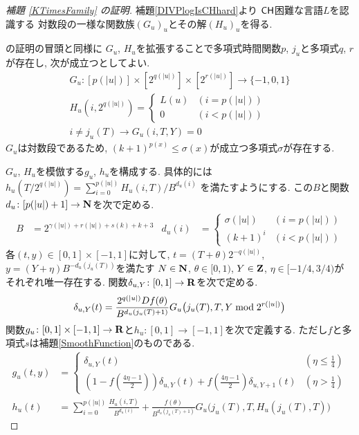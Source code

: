  \begin{proof}[\rm 補題 \ref{KTimesFamily} の証明]
  補題\ref{DIVPlogIsCHhard}より
  $\mathsf{CH}$困難な言語$L$を認識する
  対数段の一様な関数族$(G_u)_u$とその解$(H_u)_u$を得る.

  \cite[補題4.1]{kawamura2010lipschitz}の証明の冒頭と同様に
  $G _u$, $H _u$を拡張することで多項式時間関数$p$, $j_u$と多項式$q$, $r$が存在し,
  次が成立つとしてよい. 
  \begin{gather}
   G_u \colon [p(|u|)] \times [2^{q(|u|)}] \times [2^{r(|u|)}] \to \{-1, 0, 1\}
   \\
   H_u(i, 2^{q(|u|)}) = \begin{cases}
			L(u) & (i=p(|u|)) \\
			0 & (i<p(|u|))
			\end{cases}
   \\
   i \not = j_u(T)  \to G_u(i, T, Y) = 0 
  \end{gather}
  $G_u$は対数段であるため, $(k+1)^{p(x)} \le \sigma(x)$が成立つ多項式$\sigma$が存在する.

  $G _u$, $H _u$を模倣する$g _u$, $h _u$を構成する.
  具体的には$h_u(T/2^{q(|u|)}) = \sum^{p(|u|)}_{i = 0}H_u(i, T)/B^{d_u(i)}$
  を満たすようにする. この$B$と関数$d_u \colon [p(|u|)+1] \to \mathbf N$を次で定める. 
  \begin{align}
   B &= 2^{\gamma(|u|) + r(|u|) + s(k) + k + 3}
   &
   d_u(i) &= 
   \begin{cases}
    \sigma(|u|) & (i=p(|u|)) 
    \\
    (k+1)^i & (i<p(|u|))
   \end{cases}
  \end{align}
各$(t, y) \in [0,1] \times [-1, 1]$に対して,
$t = (T + \theta)2^{-q(|u|)}$, $y = (Y + \eta)B^{-d_u(j_u(T))}$を満たす
$N \in \mathbf N$, 
$\theta \in [0,1)$, 
$Y \in \mathbf Z$, 
$\eta \in [-1/4, 3/4)$が
それぞれ唯一存在する.
関数$\delta_{u,Y} \colon [0,1] \to \mathbf R$を次で定める. 
 \begin{equation} \label{eq:delta}
  \delta_{u, Y} (t) = \frac{2^{q(|u|)} D f(\theta)}{B^{d_u(j_u(T)+1)}} 
   G_u \bigl( j_u(T), T, Y \bmod 2^{r(|u|)} \bigr)
 \end{equation}
関数$
g _u \colon [0, 1] \times [-1, 1] \to \mathbf R
$と$
h _u \colon [0, 1] \to [-1, 1]
$を次で定義する.
ただし$f$と多項式$s$は補題\ref{SmoothFunction}のものである.
  \begin{align}
  \label{eq:gu}
  g_u(t,y) 
  &= \begin{cases}
     \delta_{u, Y}(t)
     & (\eta \le \frac 1 4)
     \\
     ( 1-f ( \frac{4\eta-1}{2})) \delta_{u, Y}(t)
     + f ( \frac{4\eta-1}{2}) \delta_{u,Y+1}(t)
     & (\eta > \frac 1 4)
    \end{cases}
   \\
  h_u(t) 
   &= \sum^{p(|u|)}_{i=0} \frac{H_u(i, T)}{B^{d_u(i)}}  
  + \frac{f(\theta)}{B^{d_u(j_u(T)+1)}} G_u \bigl( j_u(T), T, H_u(j_u(T), T) \bigr) 
  \label{eq:hu}
  \end{align}


\end{proof}
